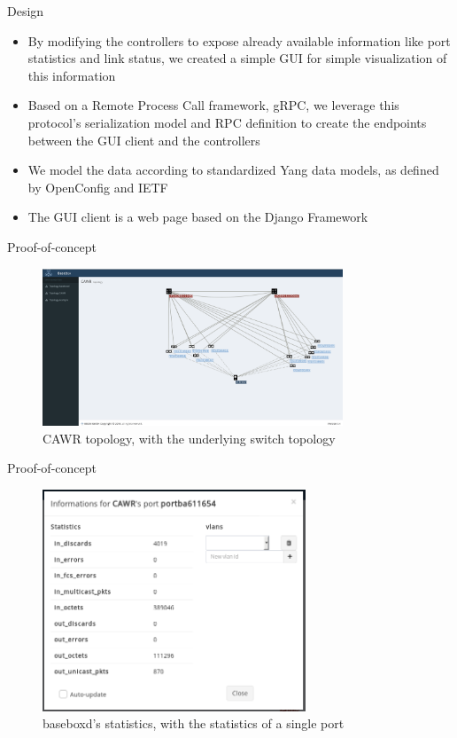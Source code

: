 \documentclass{beamer}
\begin{document}
\begin{frame}{Design}
    \begin{itemize}
        \item By modifying the controllers to expose already available information like port statistics
            and link status, we created a simple GUI for simple visualization of this information
            \pause
        \item Based on a Remote Process Call framework, gRPC, we leverage this protocol's serialization model
            and RPC definition to create the endpoints between the GUI client and the controllers
            \pause
        \item We model the data according to standardized Yang data models, as defined by OpenConfig and IETF
            \pause
        \item The GUI client is a web page based on the Django Framework
    \end{itemize}
\end{frame}

\begin{frame}{Proof-of-concept}
    \begin{figure}[!tbph]
      \centering
      \includegraphics[width=0.8\textwidth]{bisdn/cawr_gui}
      \caption {CAWR topology, with the underlying switch topology}
    \end{figure}
\end{frame}

\begin{frame}{Proof-of-concept}
    \begin{figure}[!tbph]
      \centering
      \includegraphics[width=0.7\textwidth]{bisdn/basebox_gui}
      \caption {baseboxd's statistics, with the statistics of a single port}
    \end{figure}
\end{frame}
\end{document}
